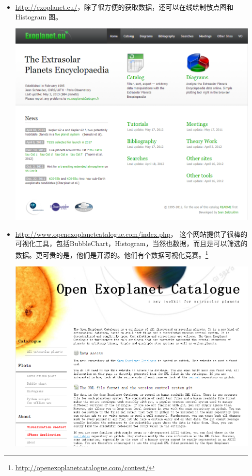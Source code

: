 \documentclass[letterpaper,10pt,english]{sphinxmanual}
\begin{document}
\begin{itemize}
\item {} 
\href{http://exoplanet.eu/}{http://exoplanet.eu/}，除了很方便的获取数据，还可以在线绘制散点图和 Histogram 图。

\includegraphics{ExoplanetEU.png}

\item {} 
\href{http://www.openexoplanetcatalogue.com/index.php}{http://www.openexoplanetcatalogue.com/index.php}， 这个网站提供了很棒的可视化工具，包括BubbleChart，Histogram，当然也数据，而且是可以筛选的数据。更可贵的是，他们是开源的。他们有个数据可视化竞赛。\footnote{
\href{http://openexoplanetcatalogue.com/contest/}{http://openexoplanetcatalogue.com/contest/}
}

\includegraphics{openexoplanetcatalogue.png}


\end{itemize}
\end{document}
